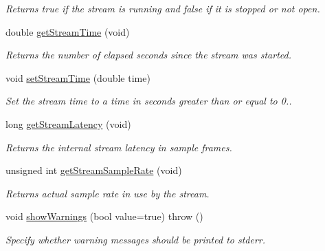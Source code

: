 \begin{DoxyCompactItemize}
\begin{DoxyCompactList}\small\item\em Returns true if the stream is running and false if it is stopped or not open. \end{DoxyCompactList}\item 
double \hyperlink{class_rt_audio_a344e59a62353c5791db4621b985cb2ca}{get\+Stream\+Time} (void)
\begin{DoxyCompactList}\small\item\em Returns the number of elapsed seconds since the stream was started. \end{DoxyCompactList}\item 
void \hyperlink{class_rt_audio_abc6e50e612251882b5a5a8d5462e406e}{set\+Stream\+Time} (double time)
\begin{DoxyCompactList}\small\item\em Set the stream time to a time in seconds greater than or equal to 0.. \end{DoxyCompactList}\item 
long \hyperlink{class_rt_audio_a843c989d9f501c71bc2f2c5ca18df9f3}{get\+Stream\+Latency} (void)
\begin{DoxyCompactList}\small\item\em Returns the internal stream latency in sample frames. \end{DoxyCompactList}\item 
unsigned int \hyperlink{class_rt_audio_a28214b8b05d60b45c24ee6fae7b2a0b5}{get\+Stream\+Sample\+Rate} (void)
\begin{DoxyCompactList}\small\item\em Returns actual sample rate in use by the stream. \end{DoxyCompactList}\item 
void \hyperlink{class_rt_audio_af0752ee51cce3dd90a3bd009f9fdbe77}{show\+Warnings} (bool value=true)  throw ()\hypertarget{class_rt_audio_af0752ee51cce3dd90a3bd009f9fdbe77}{}\label{class_rt_audio_af0752ee51cce3dd90a3bd009f9fdbe77}

\begin{DoxyCompactList}\small\item\em Specify whether warning messages should be printed to stderr. \end{DoxyCompactList}\end{DoxyCompactItemize}
